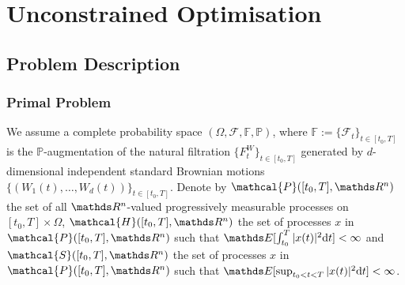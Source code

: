 \section{Unconstrained Optimisation}


\subsection{Problem Description}
\subsubsection{Primal Problem}
We assume a complete probability space $(\Omega, \mathcal{F}, \mathbb{F}, \mathbb{P})$, where $\mathbb{F} := \{\mathcal{F}_t\}_{t\in [t_0,T]}$ is the $\mathbb{P}$-augmentation
of the natural filtration $\{F_t^W\}_{t\in [t_0,T]}$ generated by $d$-dimensional independent standard Brownian motions $\{(W_1(t),\dots, W_d(t))\}_{t\in[t_0,T]}$. Denote by $\mathcal{P}([t_0, T], \R^n)$ the set of all $\R^n$-valued progressively measurable processes on $[t_0, T] \times \Omega$, $\mathcal{H}([t_0, T], \R^n)$ the set of processes $x$ in $\mathcal{P}([t_0, T], \R^n)$ such that $\E[\int_{t_0}^T |x(t)|^2 \d t] < \infty$ and $\mathcal{S}([t_0, T], \R^n)$ the set of processes $x$ in $\mathcal{P}([t_0, T], \R^n)$ such that $\E[\sup_{t_0<t<T} |x(t)|^2 \d t] < \infty$.\\

